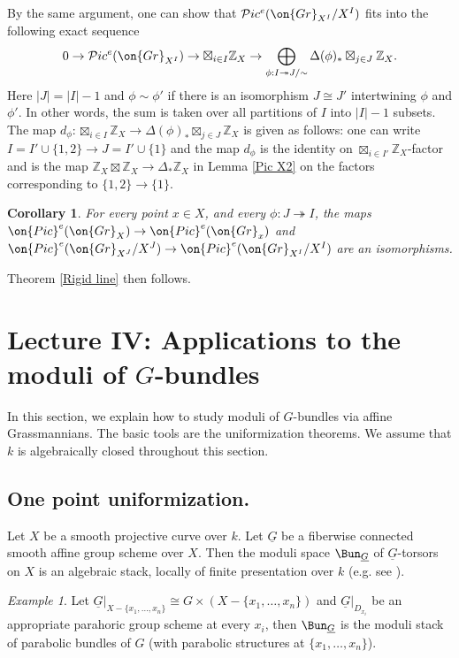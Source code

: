 \documentclass[]{pcmi}
\theoremstyle{plain}
\newtheorem{cor}[equation]{Corollary}
\theoremstyle{remark}
\newtheorem{ex}[equation]{Example}
\theoremstyle{definition}
\newcommand{\bZ}{{\mathbb Z}}
\newcommand{\mP}{{\mathcal P}}
\newcommand{\Gr}{{\on{Gr}}}
\newcommand{\Pic}{{\on{Pic}}}
\begin{document}
By the same argument, one can show that $\mP ic^e(\Gr_{X^I}/X^I)$ fits into the following exact sequence
\[0\to \mP ic^e(\Gr_{X^I})\to \boxtimes_{i\in I}\bZ_X\to \bigoplus_{\phi:I\twoheadrightarrow J/\sim}\Delta(\phi)_*\boxtimes_{j\in J}\bZ_X.\]
Here $|J|=|I|-1$ and $\phi\sim \phi'$ if there is an isomorphism $J\cong J'$ intertwining $\phi$ and $\phi'$. In other words, the sum is taken over all partitions of $I$ into $|I|-1$ subsets. The map $d_{\phi}:\boxtimes_{i\in I}\bZ_X\to \Delta(\phi)_*\boxtimes_{j\in J}\bZ_X$ is given as follows: one can write $I=I'\cup\{1,2\}\to J=I'\cup\{1\}$ and the map $d_\phi$ is the identity on $\boxtimes_{i\in I'}\bZ_X$-factor and is the map $\bZ_X\boxtimes\bZ_X\to \Delta_*\bZ_X$ in Lemma \ref{Pic X2} on the factors corresponding to $\{1,2\}\to\{1\}$.




\begin{cor}For every point $x\in X$, and every $\phi: J\twoheadrightarrow I$, the maps $\Pic^e(\Gr_X)\to \Pic^e(\Gr_x)$ and $\Pic^e(\Gr_{X^J}/X^J)\to\Pic^e(\Gr_{X^I}/X^I)$ are an isomorphisms. 
\end{cor}
Theorem \ref{Rigid line} then follows.

\section{Lecture IV: Applications to the moduli of $G$-bundles}\label{Lecture IV}
In this section, we explain how to study moduli of $G$-bundles via affine Grassmannians. The basic tools are the
uniformization theorems. We assume that $k$ is algebraically closed throughout this section.

\subsection{One point uniformization.}\label{one point uniformization}
Let $X$ be a smooth projective curve over $k$. Let $\underline G$ be a fiberwise connected smooth affine group scheme over $X$. Then the moduli space $\Bun_{\underline G}$ of $\underline G$-torsors on $X$ is an algebraic stack, locally of finite presentation over $k$ (e.g. see \cite[Proposition 1]{He}). 
\begin{ex} Let $\underline G|_{X-\{x_1,\ldots,x_n\}}\cong G\times (X-\{x_1,\ldots,x_n\})$ and $\underline G|_{D_{x_i}}$ be an appropriate parahoric group scheme at every $x_i$, then $\Bun_{\underline G}$ is the moduli stack of parabolic bundles of $G$ (with parabolic structures at $\{x_1,\ldots,x_n\}$).
\end{ex}
\end{document}
